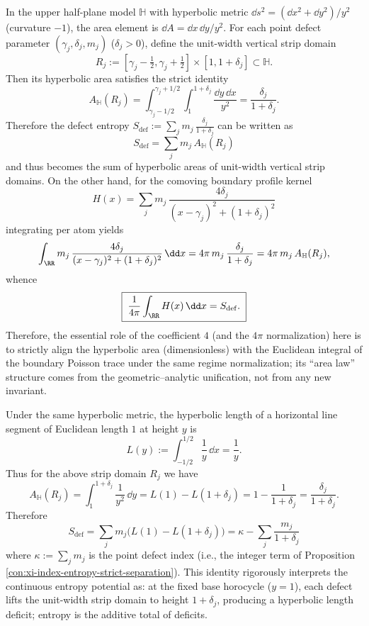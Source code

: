 \begin{proposition}
In the upper half-plane model \(\mathbb{H}\) with hyperbolic metric
\(
\dd s^{2}=(\dd x^{2}+\dd y^{2})/y^{2}
\)
(curvature \(-1\)), the area element is \(\dd A=\dd x\,\dd y/y^{2}\).
For each point defect parameter \((\gamma_j,\delta_j,m_j)\) (\(\delta_j>0\)), define the unit-width vertical strip domain
\[
R_j:=[\gamma_j-\tfrac12,\gamma_j+\tfrac12]\times[1,1+\delta_j]\subset\mathbb{H}.
\]
Then its hyperbolic area satisfies the strict identity
\[
A_{\mathbb{H}}(R_j)
=\int_{\gamma_j-1/2}^{\gamma_j+1/2}\int_{1}^{1+\delta_j}\frac{\dd y\,\dd x}{y^{2}}
=\frac{\delta_j}{1+\delta_j}.
\]
Therefore the defect entropy
\(
S_{\mathrm{def}}:=\sum_{j}m_j\,\frac{\delta_j}{1+\delta_j}
 \)
can be written as
\[
\boxed{\;
S_{\mathrm{def}}=\sum_{j}m_j\,A_{\mathbb{H}}(R_j)\;}
\]
and thus becomes the sum of hyperbolic areas of unit-width vertical strip domains.
On the other hand, for the comoving boundary profile kernel
\[
H(x)=\sum_{j} m_j\,\frac{4\delta_j}{(x-\gamma_j)^2+(1+\delta_j)^2}
\]
integrating per atom yields
\[
\int_{\RR} m_j\,\frac{4\delta_j}{(x-\gamma_j)^2+(1+\delta_j)^2}\,\dd x
=4\pi\,m_j\,\frac{\delta_j}{1+\delta_j}
=4\pi\,m_j\,A_{\mathbb{H}}(R_j),
\]
whence
\[
\boxed{\;
\frac{1}{4\pi}\int_{\RR}H(x)\,\dd x=S_{\mathrm{def}}.\;}
\]
Therefore, the essential role of the coefficient \(4\) (and the \(4\pi\) normalization) here is to strictly align the hyperbolic area (dimensionless) with the Euclidean integral of the boundary Poisson trace under the same regime normalization; its ``area law'' structure comes from the geometric--analytic unification, not from any new invariant.
\end{proposition}

\begin{proposition}
Under the same hyperbolic metric, the hyperbolic length of a horizontal line segment of Euclidean length \(1\) at height \(y\) is
\[
L(y):=\int_{-1/2}^{1/2}\frac{1}{y}\,\dd x=\frac{1}{y}.
\]
Thus for the above strip domain \(R_j\) we have
\[
A_{\mathbb{H}}(R_j)=\int_{1}^{1+\delta_j}\frac{1}{y^{2}}\,\dd y
=L(1)-L(1+\delta_j)
=1-\frac{1}{1+\delta_j}
=\frac{\delta_j}{1+\delta_j}.
\]
Therefore
\[
\boxed{\;
S_{\mathrm{def}}
=\sum_{j}m_j\bigl(L(1)-L(1+\delta_j)\bigr)
=\kappa-\sum_{j}\frac{m_j}{1+\delta_j}\;}
\]
where \(\kappa:=\sum_j m_j\) is the point defect index (i.e., the integer term of Proposition \ref{con:xi-index-entropy-strict-separation}).
This identity rigorously interprets the continuous entropy potential as: at the fixed base horocycle (\(y=1\)), each defect lifts the unit-width strip domain to height \(1+\delta_j\), producing a hyperbolic length deficit; entropy is the additive total of deficits.
\end{proposition}

